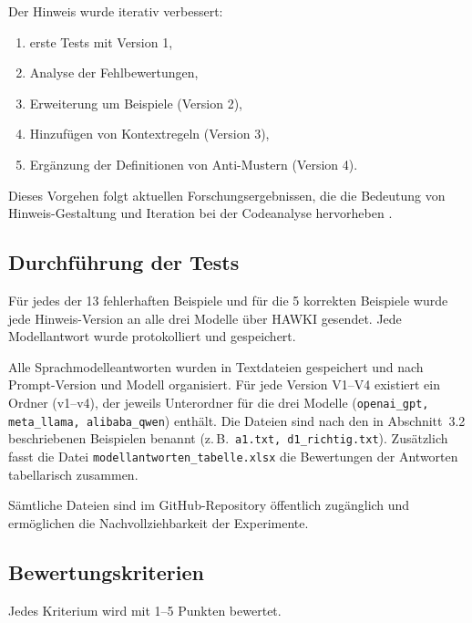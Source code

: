 \documentclass[a4paper,12pt]{article}
\begin{document}
Der Hinweis wurde iterativ verbessert:

\begin{enumerate}
    \item erste Tests mit Version 1,
    \item Analyse der Fehlbewertungen,
    \item Erweiterung um Beispiele (Version 2),
    \item Hinzufügen von Kontextregeln (Version 3),
    \item Ergänzung der Definitionen von Anti-Mustern (Version 4).
\end{enumerate}

Dieses Vorgehen folgt aktuellen Forschungsergebnissen, die die Bedeutung von Hinweis-Gestaltung und Iteration bei der Codeanalyse hervorheben \cite{llmmethodnames2025, automaticprogramming2025}.

\subsection{Durchführung der Tests}

Für jedes der 13 fehlerhaften Beispiele und für die 5 korrekten Beispiele wurde jede Hinweis-Version an alle drei Modelle über HAWKI gesendet. Jede Modellantwort wurde protokolliert und gespeichert.

Alle Sprachmodelleantworten wurden in Textdateien gespeichert und nach Prompt-Version und Modell organisiert. Für jede Version V1--V4 existiert
ein Ordner (v1--v4), der jeweils Unterordner für die drei Modelle (\texttt{openai\_gpt, meta\_llama, alibaba\_qwen}) enthält. Die Dateien sind nach
den in Abschnitt~3.2 beschriebenen Beispielen benannt (z.\,B.\ \texttt{a1.txt, d1\_richtig.txt}). Zusätzlich fasst die Datei \texttt{modellantworten\_tabelle.xlsx} die Bewertungen der Antworten tabellarisch zusammen.

Sämtliche Dateien sind im GitHub-Repository \cite{githubrepository} öffentlich zugänglich und ermöglichen die Nachvollziehbarkeit der Experimente.

\subsection{Bewertungskriterien}

Jedes Kriterium wird mit 1--5 Punkten bewertet.
\end{document}
